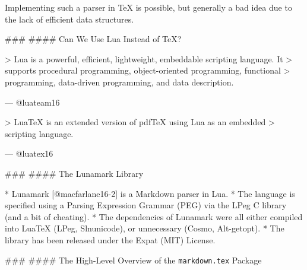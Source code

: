 \documentclass{beamer}
\begin{document}
\begin{darkframes}
\begin{frame}
Implementing such a parser in \TeX{} is possible, but generally a bad idea due
to the lack of efficient data structures.

\end{frame}
\begin{frame}

### \subsecname
#### Can We Use Lua Instead of \TeX?

> Lua is a powerful, efficient, lightweight, embeddable scripting language. It
> supports procedural programming, object-oriented programming, functional
> programming, data-driven programming, and data description. 

\hfill --- @luateam16
\vfill

> Lua\TeX{} is an extended version of pdf\TeX{} using Lua as an embedded
> scripting language.

\hfill --- @luatex16

\end{frame}
\begin{frame}

### \subsecname
#### The Lunamark Library

  * Lunamark [@macfarlane16-2] is a Markdown parser in Lua.
  * The language is specified using a Parsing Expression Grammar
    (PEG) via the LPeg C library (and a bit of cheating).
  * The dependencies of Lunamark were all either
    compiled into Lua\TeX{}
    (LPeg, Slnunicode), or unnecessary (Cosmo, Alt-getopt).
  * The library has been released under the Expat (MIT) License.

\end{frame}
\begin{frame}

### \subsecname
#### The High-Level Overview of the \texttt{markdown.tex} Package


\end{frame}
\end{darkframes}
\end{document}
